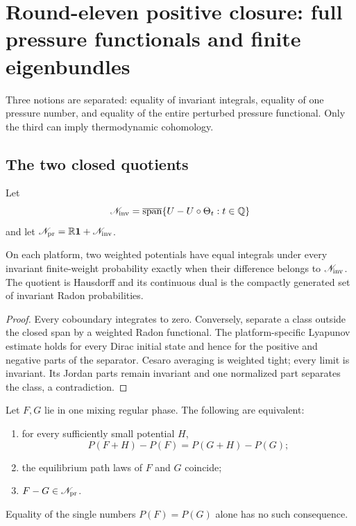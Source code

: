 \section{Round-eleven positive closure: full pressure functionals and finite eigenbundles}
\label{sec:r11-c2}

Three notions are separated: equality of invariant integrals, equality of one
pressure number, and equality of the entire perturbed pressure functional.
Only the third can imply thermodynamic cohomology.

\subsection{The two closed quotients}
Let
\[
 \mathscr N_{\rm inv}=
 \overline{\operatorname{span}}
 \{U-U\circ\Theta_t:t\in\mathbb Q\}
\]
and let $\mathscr N_{\rm pr}=\mathbb R\mathbf1+\mathscr N_{\rm inv}$.

\begin{theorem}
\label{thm:r11-c2-invariant}
On each platform, two weighted potentials have equal integrals under every
invariant finite-weight probability exactly when their difference belongs to
$\mathscr N_{\rm inv}$.  The quotient is Hausdorff and its continuous dual is
the compactly generated set of invariant Radon probabilities.
\end{theorem}

\begin{proof}
Every coboundary integrates to zero.  Conversely, separate a class outside the
closed span by a weighted Radon functional.  The platform-specific Lyapunov
estimate holds for every Dirac initial state and hence for the positive and
negative parts of the separator.  Cesaro averaging is weighted tight; every
limit is invariant.  Its Jordan parts remain invariant and one normalized part
separates the class, a contradiction.
\end{proof}

\begin{theorem}
\label{thm:r11-c2-pressure}
Let $F,G$ lie in one mixing regular phase.  The following are equivalent:
\begin{enumerate}[label=(\roman*)]
\item for every sufficiently small potential $H$,
\[
 P(F+H)-P(F)=P(G+H)-P(G);
\]
\item the equilibrium path laws of $F$ and $G$ coincide;
\item $F-G\in\mathscr N_{\rm pr}$.
\end{enumerate}
Equality of the single numbers $P(F)=P(G)$ alone has no such consequence.
\end{theorem}


